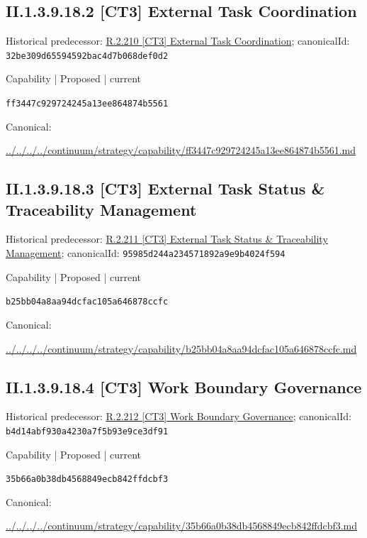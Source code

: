 \documentclass[10pt,a4paper]{article}
\begin{document}
\subsection*{II.1.3.9.18.2 [CT3] External Task Coordination}
Historical predecessor: \hyperref[element-32be309d65594592bac4d7b068def0d2]{R.2.210 [CT3] External Task Coordination}; canonicalId: \texttt{32be309d65594592bac4d7b068def0d2}\par
\label{element-ff3447c929724245a13ee864874b5561}
{\small Capability | Proposed | current}\par
\texttt{ff3447c929724245a13ee864874b5561}\par
Canonical: \par
{\footnotesize\url{../../../../continuum/strategy/capability/ff3447c929724245a13ee864874b5561.md}}\par
\subsection*{II.1.3.9.18.3 [CT3] External Task Status \& Traceability Management}
Historical predecessor: \hyperref[element-95985d244a234571892a9e9b4024f594]{R.2.211 [CT3] External Task Status \& Traceability Management}; canonicalId: \texttt{95985d244a234571892a9e9b4024f594}\par
\label{element-b25bb04a8aa94dcfac105a646878ccfc}
{\small Capability | Proposed | current}\par
\texttt{b25bb04a8aa94dcfac105a646878ccfc}\par
Canonical: \par
{\footnotesize\url{../../../../continuum/strategy/capability/b25bb04a8aa94dcfac105a646878ccfc.md}}\par
\subsection*{II.1.3.9.18.4 [CT3] Work Boundary Governance}
Historical predecessor: \hyperref[element-b4d14abf930a4230a7f5b93e9ce3df91]{R.2.212 [CT3] Work Boundary Governance}; canonicalId: \texttt{b4d14abf930a4230a7f5b93e9ce3df91}\par
\label{element-35b66a0b38db4568849ecb842ffdcbf3}
{\small Capability | Proposed | current}\par
\texttt{35b66a0b38db4568849ecb842ffdcbf3}\par
Canonical: \par
{\footnotesize\url{../../../../continuum/strategy/capability/35b66a0b38db4568849ecb842ffdcbf3.md}}\par
\end{document}
